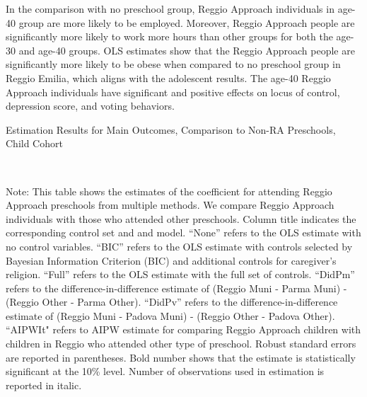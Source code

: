 In the comparison with no preschool group, Reggio Approach individuals in age-40 group are more likely to be employed. Moreover, Reggio Approach people are significantly more likely to work more hours than other groups for both the age-30 and age-40 groups. OLS estimates show that the Reggio Approach people are significantly more likely to be obese when compared to no preschool group in Reggio Emilia, which aligns with the adolescent results. The age-40 Reggio Approach individuals have significant and positive effects on locus of control, depression score, and voting behaviors. 



\begin{table}[H] \caption{Estimation Results for Main Outcomes, Comparison to Non-RA Preschools, Child Cohort} \label{ols-M-child-reg-pres}
\scalebox{0.8}{}
\vspace{1ex} \\
\footnotesize\raggedright{Note: This table shows the estimates of the coefficient for attending Reggio Approach preschools from multiple methods. We compare Reggio Approach individuals with those who attended other preschools. Column title indicates the corresponding control set and and model. ``None'' refers to the OLS estimate with no control variables. ``BIC'' refers to the OLS estimate with controls selected by Bayesian Information Criterion (BIC) and additional controls for caregiver's religion. ``Full'' refers to the OLS estimate with the full set of controls. ``DidPm'' refers to the difference-in-difference estimate of (Reggio Muni - Parma Muni) - (Reggio Other - Parma Other). ``DidPv'' refers to the difference-in-difference estimate of (Reggio Muni - Padova Muni) - (Reggio Other - Padova Other). ``AIPWIt" refers to AIPW estimate for comparing Reggio Approach children with children in Reggio who attended other type of preschool. Robust standard errors are reported in parentheses. Bold number shows that the estimate is statistically significant at the 10\% level. Number of observations used in estimation is reported in italic.}

\end{table}


